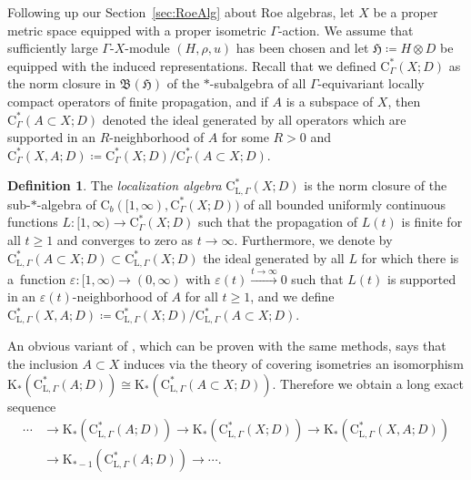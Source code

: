 \documentclass[pdftex]{sigma}
\numberwithin{equation}{section}
\theoremstyle{definition}
\newtheorem{defn}[thm]{Definition}
\newcommand{\Ct}{\mathrm{C}}
\newcommand{\Cb}{\Ct_b}
\newcommand{\HilbertMod}{\mathfrak{H}}
\newcommand{\K}{\mathrm{K}}
\newcommand{\Roe}{\mathrm{C}^*}
\newcommand{\Loc}{\mathrm{C}^*_{\mathrm{L},\Gamma}}
\newcommand{\Lin}{{\mathfrak{B}}}
\begin{document}
Following up our Section~\ref{sec:RoeAlg} about Roe algebras, let $X$ be a proper metric space equipped with a proper isometric $\Gamma$-action. We assume that sufficiently large $\Gamma$-$X$-module $(H,\rho,u)$ has been chosen and let $\HilbertMod\coloneqq H\otimes D$ be equipped with the induced representations. Recall that we defined $\Roe_\Gamma(X;D)$ as the norm closure in $\Lin(\HilbertMod)$ of the $*$-subalgebra of all $\Gamma$-equivariant locally compact operators of finite propagation, and if $A$ is a subspace of $X$, then $\Roe_\Gamma(A\subset X;D)$ denoted the ideal generated by all operators which are supported in an $R$-neighborhood of $A$ for some $R>0$ and $\Roe_\Gamma(X,A;D)\coloneqq \Roe_\Gamma(X;D)/\Roe_\Gamma(A\subset X;D)$.


\begin{defn}
The \emph{localization algebra} $\Loc(X;D)$ is the norm closure of the sub-$*$-algebra of $\Cb([1,\infty),\Roe_\Gamma(X;D))$ of all bounded uniformly continuous functions $L\colon[1,\infty)\to\Roe_\Gamma(X;D)$ such that the propagation of $L(t)$ is finite for all $t\geq 1$ and converges to zero as $t\to\infty$. Furthermore, we denote by $\Loc(A\subset X;D)\subset \Loc(X;D)$ the ideal generated by all $L$ for which there is a~function $\varepsilon\colon[1,\infty)\to(0,\infty)$ with $\varepsilon(t)\xrightarrow{t\to\infty}0$ such that $L(t)$ is supported in an $\varepsilon(t)$-neighborhood of $A$ for all $t\geq 1$, and we define $\Loc(X,A;D)\coloneqq \Loc(X;D)/\Loc(A\subset X;D)$.
\end{defn}

An obvious variant of \cite[Lemma~6.3.6]{WillettYuHigherIndexTheory}, which can be proven with the same methods, says that the inclusion $A\subset X$ induces via the theory of covering isometries an isomorphism $\K_*(\Loc(A;D))\cong\K_*(\Loc(A\subset X;D))$. Therefore we obtain a long exact sequence
\begin{align}
\cdots&\to\K_*(\Loc(A;D))\to \K_*(\Loc(X;D))\to \K_*(\Loc(X,A;D))\nonumber
\\&\to \K_{*-1}(\Loc(A;D))\to\cdots.\label{eq:localizationLES}
\end{align}
\end{document}
